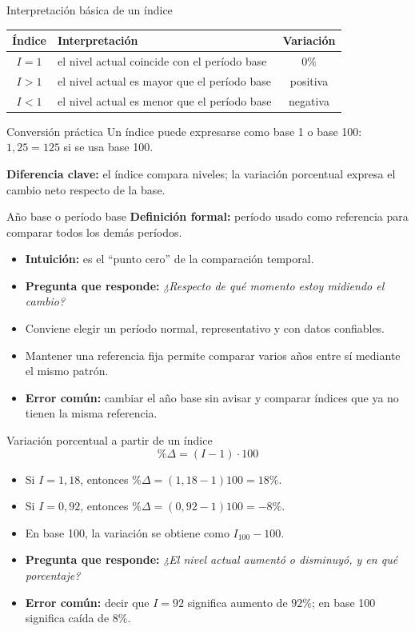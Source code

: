 \documentclass[aspectratio=169,11pt]{beamer}
\newcommand{\pregunta}[1]{\textbf{Pregunta que responde:} \emph{#1}}
\newcommand{\errorcomun}[1]{\textbf{Error común:} #1}
\newcommand{\diferencia}[1]{\textbf{Diferencia clave:} #1}
\newcommand{\intuicion}[1]{\textbf{Intuición:} #1}
\begin{document}
\begin{frame}{Interpretación básica de un índice}
\begin{center}
\begin{tabular}{c p{} c}
\toprule
Índice & Interpretación & Variación \\
\midrule
$I=1$ & el nivel actual coincide con el período base & $0\%$ \\
$I>1$ & el nivel actual es mayor que el período base & positiva \\
$I<1$ & el nivel actual es menor que el período base & negativa \\
\bottomrule
\end{tabular}
\end{center}
\begin{block}{Conversión práctica}
Un índice puede expresarse como base 1 o base 100: $1{,}25=125$ si se usa base 100.
\end{block}
\diferencia{el índice compara niveles; la variación porcentual expresa el cambio neto respecto de la base.}
\end{frame}

\begin{frame}{Año base o período base}
\textbf{Definición formal:} período usado como referencia para comparar todos los demás períodos.
\begin{itemize}
  \item \intuicion{es el ``punto cero'' de la comparación temporal.}
  \item \pregunta{¿Respecto de qué momento estoy midiendo el cambio?}
  \item Conviene elegir un período normal, representativo y con datos confiables.
  \item Mantener una referencia fija permite comparar varios años entre sí mediante el mismo patrón.
  \item \errorcomun{cambiar el año base sin avisar y comparar índices que ya no tienen la misma referencia.}
\end{itemize}
\end{frame}

\begin{frame}{Variación porcentual a partir de un índice}
\[
\%\Delta=(I-1)\cdot 100
\]
\begin{itemize}
  \item Si $I=1{,}18$, entonces $\%\Delta=(1{,}18-1)100=18\%$.
  \item Si $I=0{,}92$, entonces $\%\Delta=(0{,}92-1)100=-8\%$.
  \item En base 100, la variación se obtiene como $I_{100}-100$.
  \item \pregunta{¿El nivel actual aumentó o disminuyó, y en qué porcentaje?}
  \item \errorcomun{decir que $I=92$ significa aumento de $92\%$; en base 100 significa caída de $8\%$.}
\end{itemize}
\end{frame}
\end{document}
